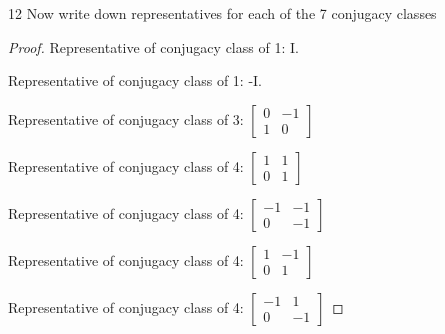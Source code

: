 \documentclass{article}
\begin{document}
\bigskip

\begin{PROB}{12}\label{Problem 12.}
    Now write down representatives for each of the 7 conjugacy classes
\end{PROB}
\begin{proof}
    Representative of conjugacy class of 1: I.
    
    Representative of conjugacy class of 1: -I.

    Representative of conjugacy class of 3: $\begin{bmatrix}
        0 & -1 \\ 1 & 0
    \end{bmatrix}$

    Representative of conjugacy class of 4: $\begin{bmatrix}
        1 & 1 \\ 0 & 1
    \end{bmatrix}$

    Representative of conjugacy class of 4: $\begin{bmatrix}
        -1 & -1 \\ 0 & -1
    \end{bmatrix}$

    Representative of conjugacy class of 4: $\begin{bmatrix}
        1 & -1 \\ 0 & 1
    \end{bmatrix}$

    Representative of conjugacy class of 4: $\begin{bmatrix}
        -1 & 1 \\ 0 & -1
    \end{bmatrix}$

\end{proof}

\bigskip
\end{document}
